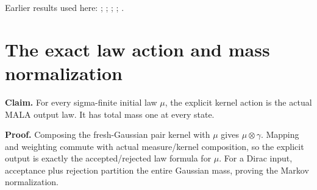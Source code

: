\documentclass[11pt,a4paper]{article}
\begin{document}
Earlier results used here: \cite[Section~3.34.1]{LangevinLean2026ULASC}; \cite[Section~3.36.2]{LangevinLean2026ULASC}; \cite[Section~3.36.5]{LangevinLean2026ULASC}; \cite[Section~3.36.6]{LangevinLean2026ULASC}; \cite[Section~3.36.8]{LangevinLean2026ULASC}.

\section{\texorpdfstring{The exact law action and mass normalization}{The exact law action and mass normalization}}


\textbf{Claim.} For every sigma-finite initial law \(\mu\), the explicit kernel action is the actual MALA output law. It has total mass one at every state.



\textbf{Proof.} Composing the fresh-Gaussian pair kernel with \(\mu\) gives \(\mu\otimes\gamma\). Mapping and weighting commute with actual measure/\allowbreak{}kernel composition, so the explicit output is exactly the accepted/\allowbreak{}rejected law formula for \(\mu\). For a Dirac input, acceptance plus rejection partition the entire Gaussian mass, proving the Markov normalization.
\end{document}
